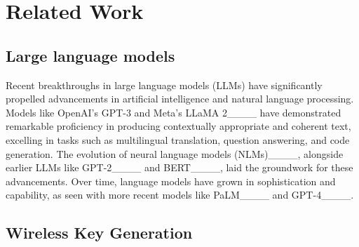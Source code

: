 \section{Related Work}
\label{sec:Background}
\subsection{Large language models}
Recent breakthroughs in large language models (LLMs) have significantly propelled advancements in artificial intelligence and natural language processing. Models like OpenAI's GPT-3 and Meta's LLaMA 2____ have demonstrated remarkable proficiency in producing contextually appropriate and coherent text, excelling in tasks such as multilingual translation, question answering, and code generation.
The evolution of neural language models (NLMs)____, alongside earlier LLMs like GPT-2____ and BERT____, laid the groundwork for these advancements. Over time, language models have grown in sophistication and capability, as seen with more recent models like PaLM____ and GPT-4____.

\subsection{Wireless Key Generation} 

